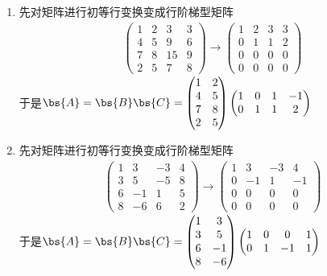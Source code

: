 \documentclass[12pt, a4paper, oneside, UTF8]{ctexbook}
\begin{document}
\begin{solution}
    \begin{enumerate}[label=(\arabic*)]
        \item 先对矩阵进行初等行变换变成行阶梯型矩阵
        \begin{align*}
            \begin{pmatrix}
                1&2&3&3\\
                4&5&9&6\\
                7&8&15&9\\
                2&5&7&8
            \end{pmatrix} \xrightarrow{}
            \begin{pmatrix}
                1&2&3&3\\
                0&1&1&2\\
                0&0&0&0\\
                0&0&0&0
            \end{pmatrix}
        \end{align*}
        于是$\bs{A}=\bs{B}\bs{C}=\begin{pmatrix}
            1&2\\
            4&5\\
            7&8\\
            2&5
        \end{pmatrix}\begin{pmatrix}
            1&0&1&-1\\
            0&1&1&2\\
        \end{pmatrix}$
    \item 先对矩阵进行初等行变换变成行阶梯型矩阵
    \begin{align*}
        \begin{pmatrix}
            1&3&-3&4\\
            3&5&-5&8\\
            6&-1&1&5\\
            8&-6&6&2
        \end{pmatrix} \xrightarrow{}
        \begin{pmatrix}
            1&3&-3&4\\
            0&-1&1&-1\\
            0&0&0&0\\
            0&0&0&0
        \end{pmatrix}
    \end{align*}
    于是$\bs{A}=\bs{B}\bs{C}=\begin{pmatrix}
        1&3\\
        3&5\\
        6&-1\\
        8&-6
    \end{pmatrix}\begin{pmatrix}
        1&0&0&1\\
        0&1&-1&1\\
    \end{pmatrix}$
    \end{enumerate}
\end{solution}
\end{document}

